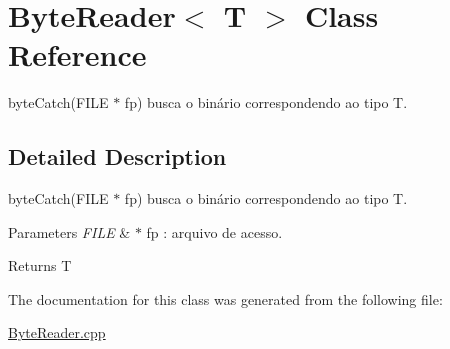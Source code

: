 \hypertarget{class_byte_reader_3_01_t_01_4}{}\section{Byte\+Reader$<$ T $>$ Class Reference}
\label{class_byte_reader_3_01_t_01_4}


byte\+Catch(\+F\+I\+L\+E $\ast$ fp) busca o binário correspondendo ao tipo T.  




\subsection{Detailed Description}
byte\+Catch(\+F\+I\+L\+E $\ast$ fp) busca o binário correspondendo ao tipo T. 


\begin{DoxyParams}{Parameters}
{\em F\+I\+LE} & $\ast$ fp \+: arquivo de acesso. \\
\hline
\end{DoxyParams}
\begin{DoxyReturn}{Returns}
T 
\end{DoxyReturn}


The documentation for this class was generated from the following file\+:\begin{DoxyCompactItemize}
\item 
\hyperlink{_byte_reader_8cpp}{Byte\+Reader.\+cpp}\end{DoxyCompactItemize}

